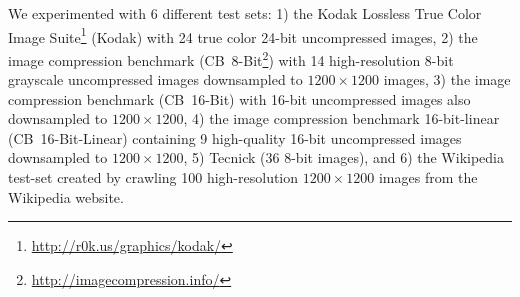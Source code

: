 \documentclass[smallabstract,smallcaptions]{dccpaper}
\begin{document}

We experimented with $6$ different test sets: 1) the Kodak Lossless True Color Image Suite\footnote{\url{http://r0k.us/graphics/kodak/}} (Kodak) with 24 true color 24-bit uncompressed images, 2) the image compression benchmark (CB~8-Bit\footnote{\url{http://imagecompression.info/}}) with 14 high-resolution 8-bit grayscale uncompressed images downsampled to $1200\times1200$ images, 3) the image compression benchmark (CB~16-Bit) with 16-bit uncompressed images also downsampled to $1200\times1200$, 4) the image compression benchmark 16-bit-linear (CB~16-Bit-Linear) containing 9 high-quality 16-bit uncompressed images downsampled to $1200\times1200$, 5) Tecnick {\cite{teck}} (36 8-bit images), and 6) the Wikipedia test-set created by crawling 100 high-resolution $1200\times1200$ images from the Wikipedia website.
\end{document}
